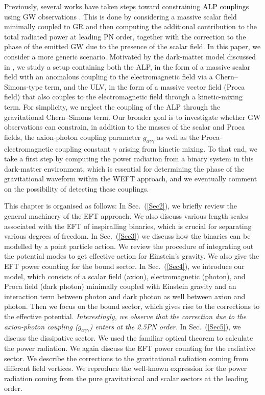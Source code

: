 Previously, several works have taken steps toward constraining \textcolor{black}{ALP couplings} using GW observations \cite{Huang:2018pbu, Zhang:2021mks}. This is done by considering a massive scalar field minimally coupled to GR and then computing the additional contribution to the total radiated power at leading PN order, together with the correction to the phase of the emitted GW due to the presence of the scalar field. In this paper, we consider a more generic scenario. Motivated by the dark-matter model discussed in \cite{Cardoso:2018tly}, we study a setup containing both the ALP, in the form of a massive scalar field with an anomalous coupling to the electromagnetic field via a Chern--Simons-type term, and the ULV, in the form of a massive vector field (Proca field) that also couples to the electromagnetic field through a kinetic-mixing term. For simplicity, we neglect the coupling of the ALP through the gravitational Chern--Simons term. Our broader goal is to investigate whether GW observations can constrain, in addition to the masses of the scalar and Proca fields, the axion-photon coupling parameter $g_{a\gamma\gamma}$ as well as the Proca-electromagnetic coupling constant $\gamma$ arising from kinetic mixing. To that end, we take a first step by computing the power radiation from a binary system in this dark-matter environment, which is essential for determining the phase of the gravitational waveform within the WEFT approach, and we eventually comment on the possibility of detecting these couplings.
\par
This chapter is organised as follows: In Sec.~(\ref{Sec2}), we briefly review the general machinery of the EFT approach. We also discuss various length scales associated with the EFT of inspiralling binaries, which is crucial for separating various degrees of freedom. In Sec.~(\ref{Sec3}) we discuss how the binaries can be modelled by a point particle action. We review the procedure of integrating out the potential modes to get effective action for Einstein's gravity. We also give the EFT power counting for the bound sector. In Sec.~(\ref{Sec4}), we introduce our model, which consists of a scalar field (axion), electromagnetic (photon), and Proca field (dark photon) minimally coupled with Einstein gravity and an interaction term between photon and dark photon as well between axion and photon. Then we focus on the bound sector, which gives rise to the corrections to the effective potential. \textit{Interestingly, we observe that the correction due to the axion-photon coupling ($g_{a\gamma\gamma}$) enters at the 2.5PN order.} In Sec.~(\ref{Sec5}), we discuss the dissipative sector. We used the familiar optical theorem to calculate the power radiation. We again discuss the EFT power counting for the radiative sector. We describe the corrections to the gravitational radiation coming from different field vertices. We reproduce the well-known expression for the power radiation coming from the pure gravitational and scalar sectors at the leading order. \par 
